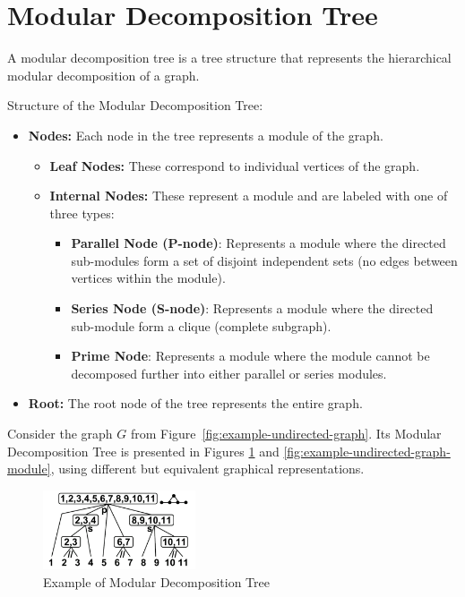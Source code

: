 \section{Modular Decomposition Tree}\label{sec:modular-decomposition-tree}

A modular decomposition tree is a tree structure that represents the hierarchical modular decomposition of a graph.

Structure of the Modular Decomposition Tree:
\begin{itemize}
    \item \textbf{Nodes:} Each node in the tree represents a module of the graph.
            \begin{itemize}
                \item \textbf{Leaf Nodes:} These correspond to individual vertices of the graph.
                \item \textbf{Internal Nodes:} These represent a module and are labeled with one of three types:
                        \begin{itemize}
                            \item \textbf{Parallel Node (P-node)}: Represents a module where the directed sub-modules form a set of disjoint independent sets (no edges between vertices within the module).
                            \item \textbf{Series Node (S-node)}: Represents a module where the directed sub-module form a clique (complete subgraph).
                            \item \textbf{Prime Node}: Represents a module where the module cannot be decomposed further into either parallel or series modules.
                        \end{itemize}
            \end{itemize}
    \item \textbf{Root:} The root node of the tree represents the entire graph.
\end{itemize}


\begin{myex}
    Consider the graph $G$ from Figure~\ref{fig:example-undirected-graph}.
    Its Modular Decomposition Tree is presented in Figures \ref{fig:example-undirected-graph-modular-decomposition-tree} and \ref{fig:example-undirected-graph-module}, using different but equivalent graphical representations.

    \begin{figure}[!h]
        \centering
        \includegraphics[width=0.40\textwidth]{images/graphs/undirected_graph_wikipedia_modular_decomposition}
        \caption{Example of Modular Decomposition Tree}
        \label{fig:example-undirected-graph-modular-decomposition-tree}
    \end{figure}
\end{myex}

